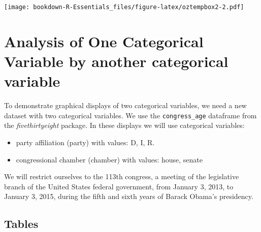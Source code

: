 \documentclass[]{book}
\newenvironment{Shaded}{\begin{snugshade}}{\end{snugshade}}
\newcommand{\KeywordTok}[1]{\textcolor[rgb]{0.13,0.29,0.53}{\textbf{#1}}}
\newcommand{\DataTypeTok}[1]{\textcolor[rgb]{0.13,0.29,0.53}{#1}}
\newcommand{\DecValTok}[1]{\textcolor[rgb]{0.00,0.00,0.81}{#1}}
\newcommand{\StringTok}[1]{\textcolor[rgb]{0.31,0.60,0.02}{#1}}
\newcommand{\CommentTok}[1]{\textcolor[rgb]{0.56,0.35,0.01}{\textit{#1}}}
\newcommand{\OperatorTok}[1]{\textcolor[rgb]{0.81,0.36,0.00}{\textbf{#1}}}
\newcommand{\NormalTok}[1]{#1}
\providecommand{\tightlist}{%
  \setlength{\itemsep}{0pt}\setlength{\parskip}{0pt}}
\begin{document}
\texttt{[image: bookdown-R-Essentials\_files/figure-latex/oztempbox2-2.pdf]}

\chapter{Analysis of One Categorical Variable by another categorical
variable}\label{analysis-of-one-categorical-variable-by-another-categorical-variable}

To demonstrate graphical displays of two categorical variables, we need
a new dataset with two categorical variables. We use the
\texttt{congress\_age} dataframe from the \emph{fivethirtyeight}
package. In these displays we will use categorical variables:

\begin{itemize}
\tightlist
\item
  party affiliation (party) with values: D, I, R.
\item
  congressional chamber (chamber) with values: house, senate
\end{itemize}

We will restrict ourselves to the 113th congress, a meeting of the
legislative branch of the United States federal government, from January
3, 2013, to January 3, 2015, during the fifth and sixth years of Barack
Obama's presidency.

\section{Tables}\label{tables}

\begin{Shaded}
\end{Shaded}
\end{document}

